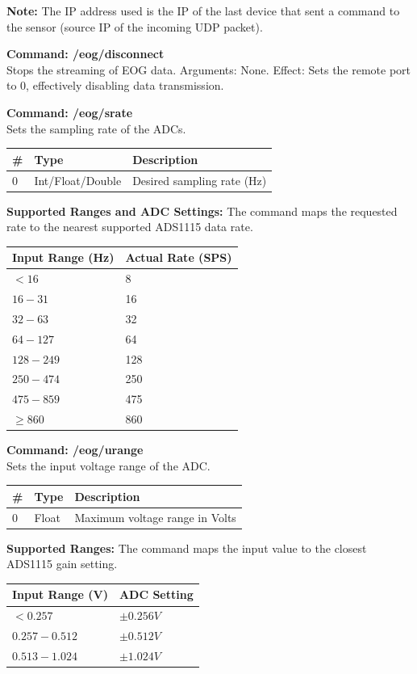 \textbf{Note:} The IP address used is the IP of the last device that sent a command to the sensor (source IP of the incoming UDP packet).

{\bf Command: /eog/disconnect}\\
Stops the streaming of EOG data. Arguments: None. Effect: Sets the
remote port to 0, effectively disabling data transmission.

{\bf Command: /eog/srate}\\
Sets the sampling rate of the ADCs.

{\small
\begin{tabular}{|l|l|l|}
\hline
\textbf{\#} & \textbf{Type} & \textbf{Description} \\ \hline
0 & Int/Float/Double & Desired sampling rate (Hz) \\ \hline
\end{tabular}
}

{\bf Supported Ranges and ADC Settings:}
The command maps the requested rate to the nearest supported ADS1115 data rate.

{\small
\begin{tabular}{|l|l|}
\hline
\textbf{Input Range (Hz)} & \textbf{Actual Rate (SPS)} \\ \hline
$< 16$ & 8 \\ \hline
$16 - 31$ & 16 \\ \hline
$32 - 63$ & 32 \\ \hline
$64 - 127$ & 64 \\ \hline
$128 - 249$ & 128 \\ \hline
$250 - 474$ & 250 \\ \hline
$475 - 859$ & 475 \\ \hline
$\ge 860$ & 860 \\ \hline
\end{tabular}
}

{\bf Command: /eog/urange}\\
Sets the input voltage range of the ADC.

{\small
\begin{tabular}{|l|l|l|}
\hline
\textbf{\#} & \textbf{Type} & \textbf{Description} \\ \hline
0 & Float & Maximum voltage range in Volts \\ \hline
\end{tabular}
}

{\bf Supported Ranges:}
The command maps the input value to the closest ADS1115 gain setting.

{\small
\begin{tabular}{|l|l|}
\hline
\textbf{Input Range (V)} & \textbf{ADC Setting} \\ \hline
$< 0.257$ & $\pm 0.256V$ \\ \hline
$0.257 - 0.512$ & $\pm 0.512V$ \\ \hline
$0.513 - 1.024$ & $\pm 1.024V$ \\ \hline
\end{tabular}
}

